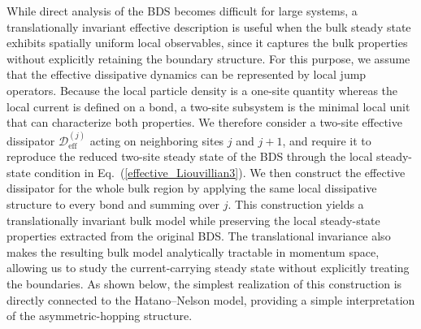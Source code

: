 \documentclass[a4paper, amsfonts, amssymb, amsmath, reprint, showkeys, nofootinbib, twoside,superscriptaddress, prb]{revtex4-2}
\newcommand{\m}[1]{\mathcal{#1}}
\newcommand{\mr}[1]{\mathrm{#1}}
\begin{document}
While direct analysis of the BDS becomes difficult for large systems, a translationally invariant effective description is useful when the bulk steady state exhibits spatially uniform local observables, since it captures the bulk properties without explicitly retaining the boundary structure.
For this purpose, we assume that the effective dissipative dynamics can be represented by local jump operators. Because the local particle density is a one-site quantity whereas the local current is defined on a bond, a two-site subsystem is the minimal local unit that can characterize both properties. We therefore consider a two-site effective dissipator $\m{D}^{(j)}_{\mr{eff}}$ acting on neighboring sites $j$ and $j+1$, and require it to reproduce the reduced two-site steady state of the BDS through the local steady-state condition in Eq.~(\ref{effective_Liouvillian3}). 
We then construct the effective dissipator for the whole bulk region by applying the same local dissipative structure to every bond and summing over $j$. This construction yields a translationally invariant bulk model while preserving the local steady-state properties extracted from the original BDS. The translational invariance also makes the resulting bulk model analytically tractable in momentum space, allowing us to study the current-carrying steady state without explicitly treating the boundaries. As shown below, the simplest realization of this construction is directly connected to the Hatano--Nelson model, providing a simple interpretation of the asymmetric-hopping structure.
\end{document}

